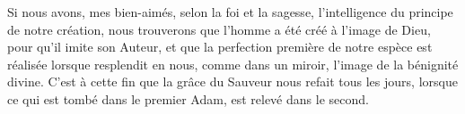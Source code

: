 Si nous avons, mes bien-aimés, selon la foi et la sagesse,
	l’intelligence du principe de notre création,
	nous trouverons que l’homme a été créé à l’image de Dieu,
	pour qu’il imite son Auteur,
	et que la perfection première de notre espèce est réalisée
	lorsque resplendit en nous, comme dans un miroir,
	l’image de la bénignité divine.
C’est à cette fin que la grâce du Sauveur nous refait tous les jours,
	lorsque ce qui est tombé dans le premier Adam, est relevé dans le second.
